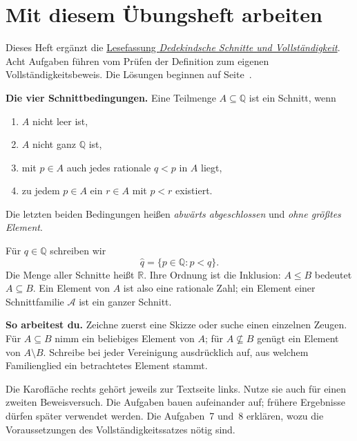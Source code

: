 \section*{Mit diesem Übungsheft arbeiten}
Dieses Heft ergänzt die
\href{_B19-cuts-reading.pdf\#cuts.reading}{Lesefassung
\emph{Dedekindsche Schnitte und Vollständigkeit}}.
Acht Aufgaben führen vom Prüfen der Definition zum eigenen
Vollständigkeitsbeweis. Die Lösungen beginnen auf
Seite~\pageref{cuts:solutions}.

\textbf{Die vier Schnittbedingungen.}
Eine Teilmenge $A\subseteq\mathbb Q$ ist ein Schnitt, wenn
\begin{enumerate}
 \item $A$ nicht leer ist,
 \item $A$ nicht ganz $\mathbb Q$ ist,
 \item mit $p\in A$ auch jedes rationale $q<p$ in $A$ liegt,
 \item zu jedem $p\in A$ ein $r\in A$ mit $p<r$ existiert.
\end{enumerate}
Die letzten beiden Bedingungen heißen \emph{abwärts abgeschlossen}
und \emph{ohne größtes Element}.

Für $q\in\mathbb Q$ schreiben wir
\[
 \widehat q=\{p\in\mathbb Q:p<q\}.
\]
Die Menge aller Schnitte heißt $\mathbb R$. Ihre Ordnung ist die
Inklusion: $A\le B$ bedeutet $A\subseteq B$.
Ein Element von $A$ ist also eine rationale Zahl;
ein Element einer Schnittfamilie $\mathcal A$ ist ein ganzer Schnitt.

\textbf{So arbeitest du.}
Zeichne zuerst eine Skizze oder suche einen einzelnen Zeugen.
Für $A\subseteq B$ nimm ein beliebiges Element von $A$;
für $A\nsubseteq B$ genügt ein Element von $A\setminus B$.
Schreibe bei jeder Vereinigung ausdrücklich auf, aus welchem
Familienglied ein betrachtetes Element stammt.

Die Karofläche rechts gehört jeweils zur Textseite links.
Nutze sie auch für einen zweiten Beweisversuch. Die Aufgaben bauen
aufeinander auf; frühere Ergebnisse dürfen später verwendet werden.
Die Aufgaben~7 und~8 erklären, wozu die Voraussetzungen des
Vollständigkeitssatzes nötig sind.


